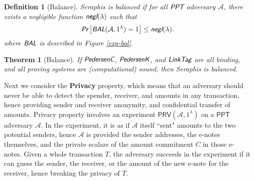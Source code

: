 \documentclass{article}
\theoremstyle{plain}
\newtheorem{definition}{Definition}[section]
\newtheorem{theorem}{Theorem}[section]
\theoremstyle{remark}
\begin{document}
\begin{definition}[Balance]
Seraphis is balanced if for all $\emph{\textsf{PPT}}$ adversary $\mathcal{A}$, there exists a negligible function $\emph{\textsf{negl}}(\lambda)$ such that
\begin{align*}
\emph{\textsf{Pr}}
\left[
\emph{\textsf{BAL}}(\mathcal{A}, 1^{\lambda})=1
\right]
\le \emph{\textsf{negl}}(\lambda).
\end{align*}
where $\emph{\textsf{BAL}}$ is described in Figure \ref{exp-bal}.
\end{definition}
\begin{theorem}[Balance]\label{thm-bal}
If $\emph{\textsf{PedersenC}}$, $\emph{\textsf{PedersenK}}$, and $\emph{\textsf{LinkTag}}$ are all binding, and all proving systems are (computational) sound, then Seraphis is balanced.  
\end{theorem}
Next we consider the \textbf{Privacy} property, which means that an adversary should never be able to detect the spender, receiver, and amounts in any transaction, hence providing sender and receiver anonymity, and confidential transfer of amounts. Privacy property involves an experiment $\textsf{PRV}(\mathcal{A}, 1^{\lambda})$ on a $\textsf{PPT}$ adversary $\mathcal{A}$. In the experiment, it is as if $\mathcal{A}$ itself ``sent" amounts to the two potential senders, hence $\mathcal{A}$ is provided the sender addresses, the e-notes themselves, and the private scalars of the amount commitment $C$ in those e-notes. Given a whole transaction $T$, the adversary succeeds in the experiment if it can guess the sender, the receiver, or the amount of the new e-note for the receiver, hence breaking the privacy of $T$.
\end{document}
